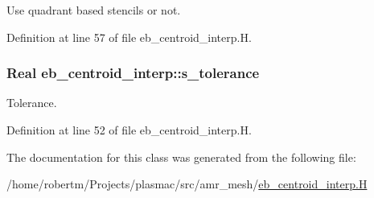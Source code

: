 Use quadrant based stencils or not. 



Definition at line 57 of file eb\+\_\+centroid\+\_\+interp.\+H.

\subsubsection[{\texorpdfstring{s\+\_\+tolerance}{s_tolerance}}]{\setlength{\rightskip}{0pt plus 5cm}Real eb\+\_\+centroid\+\_\+interp\+::s\+\_\+tolerance\hspace{0.3cm}{\ttfamily [static]}}\hypertarget{classeb__centroid__interp_a1c292a8b3cedbd4e60fcdb30e73a6554}{}\label{classeb__centroid__interp_a1c292a8b3cedbd4e60fcdb30e73a6554}


Tolerance. 



Definition at line 52 of file eb\+\_\+centroid\+\_\+interp.\+H.



The documentation for this class was generated from the following file\+:\begin{DoxyCompactItemize}
\item 
/home/robertm/\+Projects/plasmac/src/amr\+\_\+mesh/\hyperlink{eb__centroid__interp_8H}{eb\+\_\+centroid\+\_\+interp.\+H}\end{DoxyCompactItemize}
